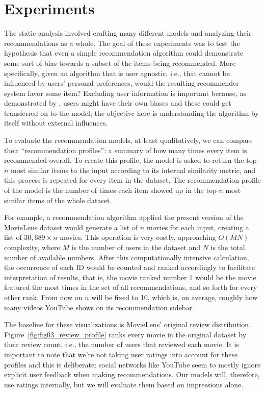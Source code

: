 \section{Experiments}
\label{sec:experiments}

The static analysis involved crafting many different models and analyzing their
recommendations as a whole. The goal of these experiments was to test the
hypothesis that even a simple recommendation algorithm could demonstrate some
sort of bias towards a subset of the items being recommended. More specifically,
given an algorithm that is user agnostic, i.e., that cannot be influenced by
users' personal preferences, would the resulting recommender system favor some
item? Excluding user information is important because, as demonstrated by
\citet{stoica_algorithmic_2018}, users might have their own biases and these
could get transferred on to the model; the objective here is understanding the
algorithm by itself without external influences.

To evaluate the recommendation models, at least qualitatively, we can compare
their ``recommendation profiles'': a summary of how many times every item is
recommended overall. To create this profile, the model is asked to return the
top-$n$ most similar items to the input according to its internal similarity
metric, and this process is repeated for every item in the dataset. The
recommendation profile of the model is the number of times each item showed up
in the top-$n$ most similar items of the whole dataset.

For example, a recommendation algorithm applied the present version of the
MovieLens dataset would generate a list of $n$ movies for each input, creating a
list of $30,689 \times n$ movies. This operation is very costly, approaching
$O(MN)$ complexity, where $M$ is the number of users in the dataset and $N$ is
the total number of available numbers. After this computationally intensive
calculation, the occurrence of each ID would be counted and ranked accordingly
to facilitate interpretation of results, that is, the movie ranked number 1
would be the movie featured the most times in the set of all recommendations,
and so forth for every other rank. From now on $n$ will be fixed to 10, which
is, on average, roughly how many videos YouTube shows on its recommendation
sidebar.

The baseline for these visualizations is MovieLens' original review
distribution. Figure~\ref{fig:fig03_review_profile} ranks every movie in the
original dataset by their review count, i.e., the number of users that reviewed
each movie. It is important to note that we're not taking user ratings into
account for these profiles and this is deliberate: social networks like YouTube
seem to mostly ignore explicit user feedback when making recommendations. Our
models will, therefore, use ratings internally, but we will evaluate them based
on impressions alone.

